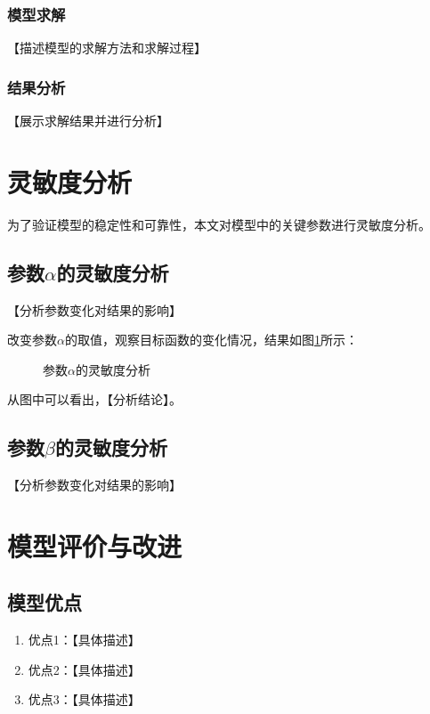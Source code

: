 \documentclass[12pt,a4paper]{ctexart}
\begin{document}
\subsubsection{模型求解}
【描述模型的求解方法和求解过程】

\subsubsection{结果分析}
【展示求解结果并进行分析】

\section{灵敏度分析}

为了验证模型的稳定性和可靠性，本文对模型中的关键参数进行灵敏度分析。

\subsection{参数$\alpha$的灵敏度分析}
【分析参数变化对结果的影响】

改变参数$\alpha$的取值，观察目标函数的变化情况，结果如图\ref{fig:sensitivity1}所示：

\begin{figure}[H]
\centering
\caption{参数$\alpha$的灵敏度分析}
\label{fig:sensitivity1}
\end{figure}

从图中可以看出，【分析结论】。

\subsection{参数$\beta$的灵敏度分析}
【分析参数变化对结果的影响】

\section{模型评价与改进}

\subsection{模型优点}
\begin{enumerate}
    \item 优点1：【具体描述】
    \item 优点2：【具体描述】
    \item 优点3：【具体描述】
\end{enumerate}
\end{document}
